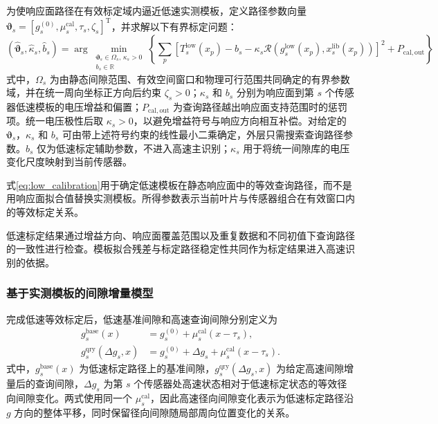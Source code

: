 \documentclass[UTF8,12pt,a4paper]{ctexart}
\newcommand{\Rcal}{\mathcal{R}}
\begin{document}
为使响应面路径在有效标定域内逼近低速实测模板，定义路径参数向量 $\bm\vartheta_s=[g_s^{(0)},\mu_s^{\mathrm{cal}},\tau_s,\zeta_s]^{\mathrm T}$，并求解以下有界标定问题：
\begin{equation}
(\widehat{\bm\vartheta}_s,\widehat\kappa_s,\widehat b_s)
=\arg\min_{\substack{\bm\vartheta_s\in\Omega_s,\,\kappa_s>0\\b_s\in\mathbb R}}
\left\{
\sum_p
\left[
T_s^{\mathrm{low}}(x_p)-b_s
-\kappa_s\Rcal\!\left(
g_s^{\mathrm{low}}(x_p),x_s^{\mathrm{lib}}(x_p)
\right)
\right]^2
+P_{\mathrm{cal,out}}
\right\}
\label{eq:low_calibration}
\end{equation}
式中，$\Omega_s$ 为由静态间隙范围、有效空间窗口和物理可行范围共同确定的有界参数域，并在统一周向坐标正方向后约束 $\zeta_s>0$；$\kappa_s$ 和 $b_s$ 分别为响应面到第 $s$ 个传感器低速模板的电压增益和偏置；$P_{\mathrm{cal,out}}$ 为查询路径越出响应面支持范围时的惩罚项。统一电压极性后取 $\kappa_s>0$，以避免增益符号与响应方向相互补偿。对给定的 $\bm\vartheta_s$，$\kappa_s$ 和 $b_s$ 可由带上述符号约束的线性最小二乘确定，外层只需搜索查询路径参数。$b_s$ 仅为低速标定辅助参数，不进入高速主识别；$\kappa_s$ 用于将统一间隙库的电压变化尺度映射到当前传感器。

式\eqref{eq:low_calibration}用于确定低速模板在静态响应面中的等效查询路径，而不是用响应面拟合值替换实测模板。所得参数表示当前叶片与传感器组合在有效窗口内的等效标定关系。

低速标定结果通过增益方向、响应面覆盖范围以及重复数据和不同初值下查询路径的一致性进行检查。模板拟合残差与标定路径稳定性共同作为标定结果进入高速识别的依据。

\subsubsection{基于实测模板的间隙增量模型}

完成低速等效标定后，低速基准间隙和高速查询间隙分别定义为
\begin{align}
g_s^{\mathrm{base}}(x)
&=g_s^{(0)}+\mu_s^{\mathrm{cal}}(x-\tau_s),
\label{eq:g_base}\\
g_s^{\mathrm{qry}}(\Delta g_s,x)
&=g_s^{(0)}+\Delta g_s
+\mu_s^{\mathrm{cal}}(x-\tau_s).
\label{eq:g_query}
\end{align}
式中，$g_s^{\mathrm{base}}(x)$ 为低速标定路径上的基准间隙，$g_s^{\mathrm{qry}}(\Delta g_s,x)$ 为给定高速间隙增量后的查询间隙，$\Delta g_s$ 为第 $s$ 个传感器处高速状态相对于低速标定状态的等效径向间隙变化。两式使用同一个 $\mu_s^{\mathrm{cal}}$，因此高速径向间隙变化表示为低速标定路径沿 $g$ 方向的整体平移，同时保留径向间隙随局部周向位置变化的关系。
\end{document}

